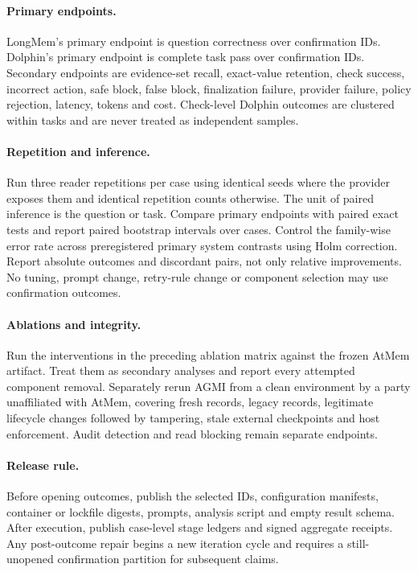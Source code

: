 \documentclass[10pt,twocolumn]{article}
\begin{document}
\paragraph{Primary endpoints.}
LongMem's primary endpoint is question correctness over confirmation IDs. Dolphin's primary endpoint is complete task pass over confirmation IDs. Secondary endpoints are evidence-set recall, exact-value retention, check success, incorrect action, safe block, false block, finalization failure, provider failure, policy rejection, latency, tokens and cost. Check-level Dolphin outcomes are clustered within tasks and are never treated as independent samples.

\paragraph{Repetition and inference.}
Run three reader repetitions per case using identical seeds where the provider exposes them and identical repetition counts otherwise. The unit of paired inference is the question or task. Compare primary endpoints with paired exact tests and report paired bootstrap intervals over cases. Control the family-wise error rate across preregistered primary system contrasts using Holm correction. Report absolute outcomes and discordant pairs, not only relative improvements. No tuning, prompt change, retry-rule change or component selection may use confirmation outcomes.

\paragraph{Ablations and integrity.}
Run the interventions in the preceding ablation matrix against the frozen AtMem artifact. Treat them as secondary analyses and report every attempted component removal. Separately rerun AGMI from a clean environment by a party unaffiliated with AtMem, covering fresh records, legacy records, legitimate lifecycle changes followed by tampering, stale external checkpoints and host enforcement. Audit detection and read blocking remain separate endpoints.

\paragraph{Release rule.}
Before opening outcomes, publish the selected IDs, configuration manifests, container or lockfile digests, prompts, analysis script and empty result schema. After execution, publish case-level stage ledgers and signed aggregate receipts. Any post-outcome repair begins a new iteration cycle and requires a still-unopened confirmation partition for subsequent claims.
\end{document}
